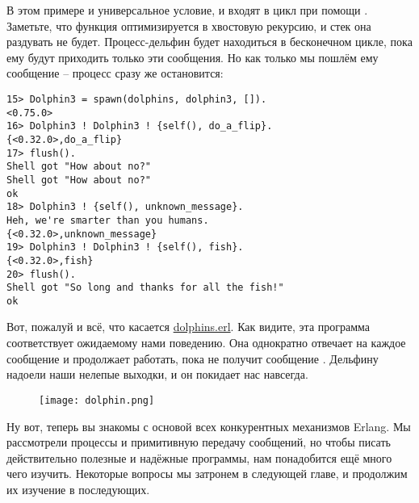 В этом примере и универсальное условие, и  входят в цикл при помощи .
Заметьте, что функция оптимизируется в хвостовую рекурсию, и стек она раздувать не будет.
Процесс\--дельфин будет находиться в бесконечном цикле, пока ему будут приходить только эти сообщения. 
Но как только мы пошлём ему сообщение \--- процесс сразу же остановится:
\begin{lstlisting}[style=erlang]
15> Dolphin3 = spawn(dolphins, dolphin3, []).
<0.75.0>
16> Dolphin3 ! Dolphin3 ! {self(), do_a_flip}.
{<0.32.0>,do_a_flip}
17> flush().
Shell got "How about no?"
Shell got "How about no?"
ok
18> Dolphin3 ! {self(), unknown_message}.    
Heh, we're smarter than you humans.
{<0.32.0>,unknown_message}
19> Dolphin3 ! Dolphin3 ! {self(), fish}.
{<0.32.0>,fish}
20> flush().
Shell got "So long and thanks for all the fish!"
ok
\end{lstlisting}

Вот, пожалуй и всё, что касается \href{file:///home/max/prog/learnyousomeerlang/original/learnyousomeerlang.com/static/erlang/dolphins.erl}{dolphins.erl}.
Как видите, эта программа соответствует ожидаемому нами поведению.
Она однократно отвечает на каждое сообщение и продолжает работать, пока не получит сообщение .
Дельфину надоели наши нелепые выходки, и он покидает нас навсегда.
\begin{figure}[h!]
    \centering
    \texttt{[image: dolphin.png]}
\end{figure}

Ну вот, теперь вы знакомы с основой всех конкурентных механизмов Erlang.
Мы рассмотрели процессы и примитивную передачу сообщений, но чтобы писать действительно полезные и надёжные программы, нам понадобится ещё много чего изучить.
Некоторые вопросы мы затронем в следующей главе, и продолжим их изучение в последующих.
